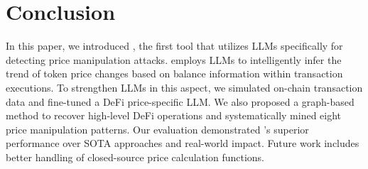 \vspace{-1.5ex}
\section{Conclusion}
\label{sec:conclusion}

In this paper, we introduced \tool, the first tool that utilizes LLMs specifically for detecting price manipulation attacks.
\tool employs LLMs to intelligently infer the trend of token price changes based on balance information within transaction executions.
To strengthen LLMs in this aspect, we simulated on-chain transaction data and fine-tuned a DeFi price-specific LLM.
We also proposed a graph-based method to recover high-level DeFi operations and systematically mined eight price manipulation patterns.
Our evaluation demonstrated \tool's superior performance over SOTA approaches and real-world impact.
Future work includes better handling of closed-source price calculation functions.